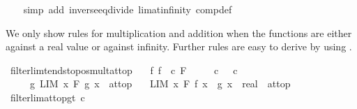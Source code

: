 \begin{isabellebody}
%
\isadelimproof
\ \ %
\endisadelimproof
%
\isatagproof
{}\isamarkupfalse%
\ {\isacharparenleft}{\kern0pt}simp\ add{\isacharcolon}{\kern0pt}\ inverse{\isacharunderscore}{\kern0pt}eq{\isacharunderscore}{\kern0pt}divide\ lim{\isacharunderscore}{\kern0pt}at{\isacharunderscore}{\kern0pt}infinity{\isacharunderscore}{\kern0pt}{}\ comp{\isacharunderscore}{\kern0pt}def{\isacharparenright}{\kern0pt}%
\endisatagproof
{\isafoldproof}%
%
\isadelimproof
%
\endisadelimproof
%
\begin{isamarkuptext}%
We only show rules for multiplication and addition when the functions are either against a real
  value or against infinity. Further rules are easy to derive by using .%
\end{isamarkuptext}\isamarkuptrue%
\isamarkupfalse%
\ filterlim{\isacharunderscore}{\kern0pt}tendsto{\isacharunderscore}{\kern0pt}pos{\isacharunderscore}{\kern0pt}mult{\isacharunderscore}{\kern0pt}at{\isacharunderscore}{\kern0pt}top{\isacharcolon}{\kern0pt}\isanewline
\ \ \ f{\isacharcolon}{\kern0pt}\ {\isachardoublequoteopen}{\isacharparenleft}{\kern0pt}f\ {\isasymlonglongrightarrow}\ c{\isacharparenright}{\kern0pt}\ F{\isachardoublequoteclose}\isanewline
\ \ \ \ \ c{\isacharcolon}{\kern0pt}\ {\isachardoublequoteopen}{}\ {\isacharless}{\kern0pt}\ c{\isachardoublequoteclose}\isanewline
\ \ \ \ \ g{\isacharcolon}{\kern0pt}\ {\isachardoublequoteopen}LIM\ x\ F{\isachardot}{\kern0pt}\ g\ x\ {\isacharcolon}{\kern0pt}{\isachargreater}{\kern0pt}\ at{\isacharunderscore}{\kern0pt}top{\isachardoublequoteclose}\isanewline
\ \ \ {\isachardoublequoteopen}LIM\ x\ F{\isachardot}{\kern0pt}\ {\isacharparenleft}{\kern0pt}f\ x\ {\isacharasterisk}{\kern0pt}\ g\ x\ {\isacharcolon}{\kern0pt}{\isacharcolon}{\kern0pt}\ real{\isacharparenright}{\kern0pt}\ {\isacharcolon}{\kern0pt}{\isachargreater}{\kern0pt}\ at{\isacharunderscore}{\kern0pt}top{\isachardoublequoteclose}\isanewline
%
\isadelimproof
\ \ %
\endisadelimproof
%
\isatagproof
{}\isamarkupfalse%
\ filterlim{\isacharunderscore}{\kern0pt}at{\isacharunderscore}{\kern0pt}top{\isacharunderscore}{\kern0pt}gt{\isacharbrackleft}{\kern0pt}\ c{\isacharequal}{\kern0pt}{}{\isacharbrackright}{\kern0pt}\isanewline

\end{isabellebody}
